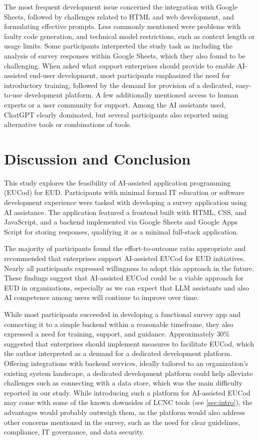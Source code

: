 \documentclass[english,anonymous]{lni}
\begin{document}
The most frequent development issue concerned the integration with Google Sheets, followed by challenges related to HTML and web development, and formulating effective prompts. Less commonly mentioned were problems with faulty code generation, and technical model restrictions, such as context length or usage limits.
Some participants interpreted the study task as including the analysis of survey responses within Google Sheets, which they also found to be challenging.
When asked what support enterprises should provide to enable AI-assisted end-user development, most participants emphasized the need for introductory training, followed by the demand for provision of a dedicated, easy-to-use development platform. A few additionally mentioned access to human experts or a user community for support.
Among the AI assistants used, ChatGPT clearly dominated, but several participants also reported using alternative tools or combinations of tools.

\section{Discussion and Conclusion}

This study explores the feasibility of AI-assisted application programming (EUCod) for EUD. Participants with minimal formal IT education or software development experience were tasked with developing a survey application using AI assistance. The application featured a frontend built with HTML, CSS, and JavaScript, and a backend implemented via Google Sheets and Google Apps Script for storing responses, qualifying it as a minimal full-stack application.

The majority of participants found the effort-to-outcome ratio appropriate and recommended that enterprises support AI-assisted EUCod for EUD initiatives. Nearly all participants expressed willingness to adopt this approach in the future. These findings suggest that AI-assisted EUCod could be a viable approach for EUD in organizations, especially as we can expect that  LLM assistants and also  AI competence among users will continue to improve over time.


While most participants succeeded in developing a functional survey app and connecting it to a simple backend within a reasonable timeframe, they also expressed a need for training, support, and guidance. Approximately 30\% suggested that enterprises should implement measures to facilitate EUCod, which the author interpreted as a demand for a dedicated development platform.
Offering integrations with backend services, ideally tailored to an organization’s existing system landscape,  a dedicated development platform could help alleviate challenges such as connecting with a data store, which was the main difficulty reported in our study. While introducing such a platform for AI-assisted EUCod may come with some of the known downsides of LCNC tools (see \cref{sec:intro}),  the advantages would probably outweigh them, as the platform would also  address other concerns mentioned in the survey, such as the need for clear guidelines, compliance, IT governance, and data security.
\end{document}
